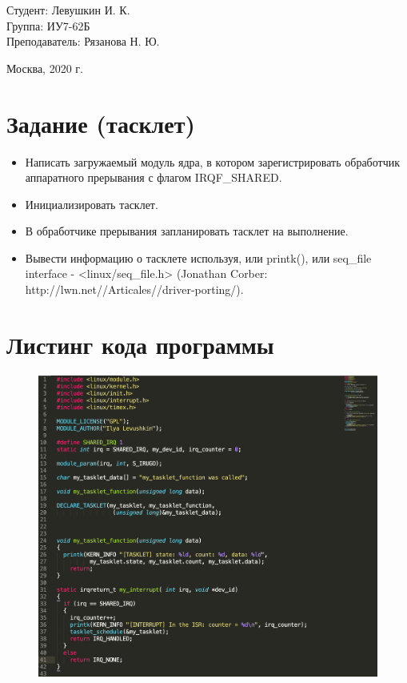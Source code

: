 \documentclass[a4paper,12pt]{article}
\begin{document}
	\large
	\begin{flushright}
		Студент: Левушкин И. К. \\
		Группа: ИУ7-62Б \\
		Преподаватель: Рязанова Н. Ю. \\
	\end{flushright}
	
	\vspace*{30mm}
	\begin{center}
		Москва, 2020 г.  
	\end{center}
	\thispagestyle{empty}
	
	\newpage
	
	\section*{Задание (тасклет)}
	
	\begin{itemize}
		\item Написать загружаемый модуль ядра, в котором зарегистрировать обработчик аппаратного прерывания с флагом IRQF\_SHARED.
		\item Инициализировать тасклет.
		\item В обработчике прерывания запланировать тасклет на выполнение.
		\item Вывести информацию о тасклете используя, или printk(), или seq\_file interface - <linux/seq\_file.h> (Jonathan Corber: http://lwn.net//Articales//driver-porting/).
	\end{itemize}

	\newpage

	\section*{Листинг кода программы}
	
	\begin{figure}[h!]
		\begin{center}
			{\includegraphics[scale = 0.7]{listing1.png}}
			\label{listing1}
		\end{center}
	\end{figure}
\end{document}

